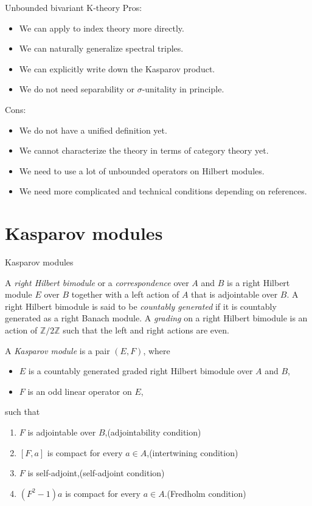 \documentclass[handout]{../../../slide}
\begin{document}
\begin{frame}{Unbounded bivariant K-theory}
Pros:
\begin{itemize}
\item We can apply to index theory more directly.
\item We can naturally generalize spectral triples.
\item We can explicitly write down the Kasparov product.
\item We do not need separability or $\sigma$-unitality in principle.
\end{itemize}
\pause
Cons:
\begin{itemize}
\item We do not have a unified definition yet.
\item We cannot characterize the theory in terms of category theory yet.
\item We need to use a lot of unbounded operators on Hilbert modules.
\item We need more complicated and technical conditions depending on references.
\end{itemize}
\end{frame}





\section{Kasparov modules}
\contents


\begin{frame}{Kasparov modules}
\begin{defn}
A \emph{right Hilbert bimodule} or a \emph{correspondence} over $A$ and $B$ is a right Hilbert module $E$ over $B$ together with a left action of $A$ that is adjointable over $B$.
A right Hilbert bimodule is said to be \emph{countably generated} if it is countably generated as a right Banach module.
A \emph{grading} on a right Hilbert bimodule is an action of $\mathbb{Z}/2\mathbb{Z}$ such that the left and right actions are even.
\end{defn}
\pause
\begin{defn}
A \emph{Kasparov module} is a pair $(E,F)$, where
\begin{itemize}
\item $E$ is a countably generated graded right Hilbert bimodule over $A$ and $B$,
\item $F$ is an odd linear operator on $E$,
\end{itemize}
such that
\begin{enumerate}
\item $F$ is adjointable over $B$,\hfill(adjointability condition)
\item $[F,a]$ is compact for every $a\in A$,\hfill(intertwining condition)
\item $F$ is self-adjoint,\hfill(self-adjoint condition)
\item $(F^2-1)a$ is compact for every $a\in A$.\hfill(Fredholm condition)
\end{enumerate}
\end{defn}
\end{frame}
\end{document}
